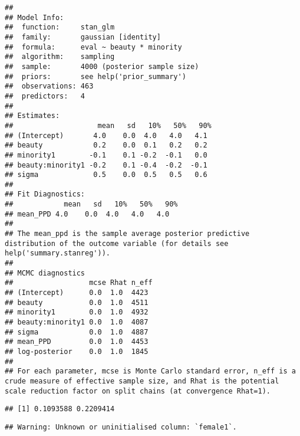 \documentclass[
]{article}
\newenvironment{Shaded}{\begin{snugshade}}{\end{snugshade}}
\newcommand{\FunctionTok}[1]{\textcolor[rgb]{0.00,0.00,0.00}{#1}}
\newcommand{\NormalTok}[1]{#1}
\newcommand{\SpecialCharTok}[1]{\textcolor[rgb]{0.00,0.00,0.00}{#1}}
\begin{document}
\begin{verbatim}
## 
## Model Info:
##  function:     stan_glm
##  family:       gaussian [identity]
##  formula:      eval ~ beauty * minority
##  algorithm:    sampling
##  sample:       4000 (posterior sample size)
##  priors:       see help('prior_summary')
##  observations: 463
##  predictors:   4
## 
## Estimates:
##                    mean   sd   10%   50%   90%
## (Intercept)       4.0    0.0  4.0   4.0   4.1 
## beauty            0.2    0.0  0.1   0.2   0.2 
## minority1        -0.1    0.1 -0.2  -0.1   0.0 
## beauty:minority1 -0.2    0.1 -0.4  -0.2  -0.1 
## sigma             0.5    0.0  0.5   0.5   0.6 
## 
## Fit Diagnostics:
##            mean   sd   10%   50%   90%
## mean_PPD 4.0    0.0  4.0   4.0   4.0  
## 
## The mean_ppd is the sample average posterior predictive distribution of the outcome variable (for details see help('summary.stanreg')).
## 
## MCMC diagnostics
##                  mcse Rhat n_eff
## (Intercept)      0.0  1.0  4423 
## beauty           0.0  1.0  4511 
## minority1        0.0  1.0  4932 
## beauty:minority1 0.0  1.0  4087 
## sigma            0.0  1.0  4887 
## mean_PPD         0.0  1.0  4453 
## log-posterior    0.0  1.0  1845 
## 
## For each parameter, mcse is Monte Carlo standard error, n_eff is a crude measure of effective sample size, and Rhat is the potential scale reduction factor on split chains (at convergence Rhat=1).
\end{verbatim}

\begin{Shaded}
\end{Shaded}

\begin{verbatim}
## [1] 0.1093588 0.2209414
\end{verbatim}

\begin{Shaded}
\end{Shaded}

\begin{verbatim}
## Warning: Unknown or uninitialised column: `female1`.
\end{verbatim}
\end{document}

